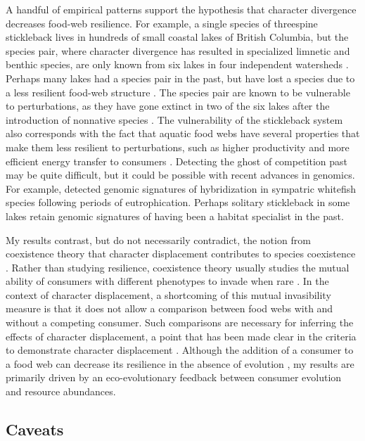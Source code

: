 \documentclass[11pt,]{article}
\begin{document}
A handful of empirical patterns support the hypothesis that character
divergence decreases food-web resilience. For example, a single species
of threespine stickleback lives in hundreds of small coastal lakes of
British Columbia, but the species pair, where character divergence has
resulted in specialized limnetic and benthic species, are only known
from six lakes in four independent watersheds
\citep{Schluter1992, Schluter2000}. Perhaps many lakes had a species
pair in the past, but have lost a species due to a less resilient
food-web structure \citep{Borrelli2015a, Borrelli2015b}. The species
pair are known to be vulnerable to perturbations, as they have gone
extinct in two of the six lakes after the introduction of nonnative
species \citep{Hatfield2001, Taylor2006, Rudman2016}. The vulnerability
of the stickleback system also corresponds with the fact that aquatic
food webs have several properties that make them less resilient to
perturbations, such as higher productivity and more efficient energy
transfer to consumers \citep{Rip2011}. Detecting the ghost of
competition past \citep{Connell1980} may be quite difficult, but it
could be possible with recent advances in genomics. For example,
\citet{Feulner2018} detected genomic signatures of hybridization in
sympatric whitefish species following periods of eutrophication. Perhaps
solitary stickleback in some lakes retain genomic signatures of having
been a habitat specialist in the past.

My results contrast, but do not necessarily contradict, the notion from
coexistence theory that character displacement contributes to species
coexistence \citep{Lawlor1976}. Rather than studying resilience,
coexistence theory usually studies the mutual ability of consumers with
different phenotypes to invade when rare \citep[mutual
invasibility,][]{Chesson2000}. In the context of character displacement,
a shortcoming of this mutual invasibility measure is that it does not
allow a comparison between food webs with and without a competing
consumer. Such comparisons are necessary for inferring the effects of
character displacement, a point that has been made clear in the criteria
to demonstrate character displacement
\citep{Schluter1992, Schluter2000}. Although the addition of a consumer
to a food web can decrease its resilience in the absence of evolution
\citep{May1973}, my results are primarily driven by an eco-evolutionary
feedback between consumer evolution and resource abundances.

\subsection{Caveats}\label{caveats}
\end{document}
